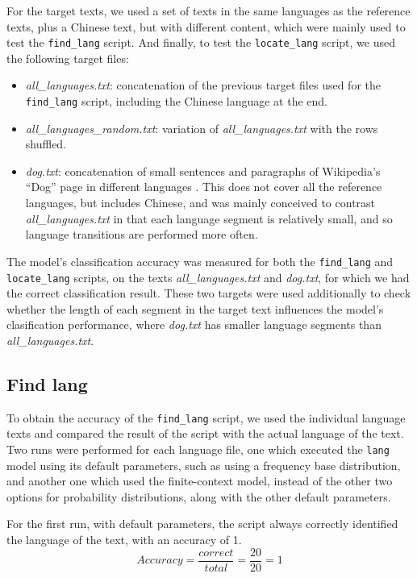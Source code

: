 \documentclass{article}
\begin{document}
For the target texts, we used a set of texts in the same languages as the reference texts, plus a Chinese text, but with different content, which were mainly used to test the \texttt{find\_lang} script.
And finally, to test the \texttt{locate\_lang} script, we used the following target files:

\begin{itemize}
    \item \textit{all\_languages.txt}: concatenation of the previous target files used for the \texttt{find\_lang} script, including the Chinese language at the end.
    \item \textit{all\_languages\_random.txt}: variation of \textit{all\_languages.txt} with the rows shuffled.
    \item \textit{dog.txt}: concatenation of small sentences and paragraphs of Wikipedia's ``Dog'' page in different languages \cite{wiki:dog}. This does not cover all the reference languages, but includes Chinese, and was mainly conceived to contrast \textit{all\_languages.txt} in that each language segment is relatively small, and so language transitions are performed more often.
\end{itemize}

The model's classification accuracy was measured for both the \texttt{find\_lang} and \texttt{locate\_lang} scripts, on the texts \textit{all\_languages.txt} and \textit{dog.txt}, for which we had the correct classification result.
These two targets were used additionally to check whether the length of each segment in the target text influences the model's clasification performance, where \textit{dog.txt} has smaller language segments than \textit{all\_languages.txt}.

\subsection{Find lang}
\label{subsec:results_find_lang}

To obtain the accuracy of the \texttt{find\_lang} script, we used the individual language texts and compared the result of the script with the actual language of the text.
Two runs were performed for each language file, one which executed the \texttt{lang} model using its default parameters, such as using a frequency base distribution,
and another one which used the finite-context model, instead of the other two options for probability distributions, along with the other default parameters.

For the first run, with default parameters, the script always correctly identified the language of the text, with an accuracy of 1.
\begin{equation}
    \label{eq:find_lang_default_accuracy}
    Accuracy = \frac{correct}{total} = \frac{20}{20} = 1
\end{equation}
\end{document}
